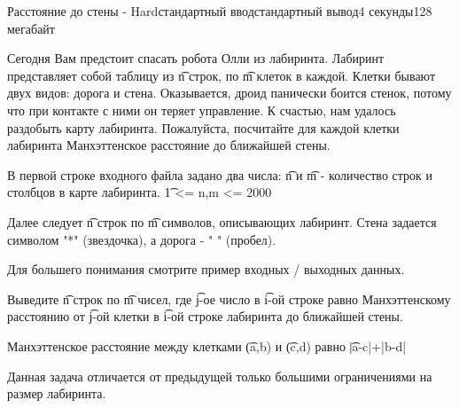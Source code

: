 \begin{problem}{Расстояние до стены - Hard}{стандартный ввод}{стандартный вывод}{4 секунды}{128 мегабайт}

Сегодня Вам предстоит спасать робота Олли из лабиринта. Лабиринт представляет собой таблицу из \t{n} строк, по \t{m} клеток в каждой. Клетки бывают двух видов: дорога и стена.
Оказывается, дроид панически боится стенок, потому что при контакте с ними он теряет управление. К счастью, нам удалось раздобыть карту лабиринта. Пожалуйста, посчитайте для каждой клетки лабиринта Манхэттенское расстояние до ближайшей стены.



\InputFile
В первой строке входного файла задано два числа: \t{n} и \t{m} - количество строк и столбцов в карте лабиринта. \t{1 <= n,m <= 2000}

Далее следует \t{n} строк по \t{m} символов, описывающих лабиринт. Стена задается символом "*" (звездочка), а дорога - " " (пробел).

Для большего понимания смотрите пример входных / выходных данных.

\OutputFile
Выведите \t{n} строк по \t{m} чисел, где \t{j}-ое число в \t{i}-ой строке равно Манхэттенскому расстоянию от \t{j}-ой клетки в \t{i}-ой строке лабиринта до ближайшей стены.


\Note
Манхэттенское расстояние между клетками \t{(a,b)} и \t{(c,d)} равно \t{|a-c|+|b-d|}

Данная задача отличается от предыдущей только большими ограничениями на размер лабиринта.

\end{problem}

